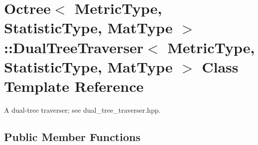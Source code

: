 \section{Octree$<$ Metric\+Type, Statistic\+Type, Mat\+Type $>$\+:\+:Dual\+Tree\+Traverser$<$ Metric\+Type, Statistic\+Type, Mat\+Type $>$ Class Template Reference}
\label{classmlpack_1_1tree_1_1Octree_1_1DualTreeTraverser}


A dual-\/tree traverser; see dual\+\_\+tree\+\_\+traverser.\+hpp.  


\subsection*{Public Member Functions}
